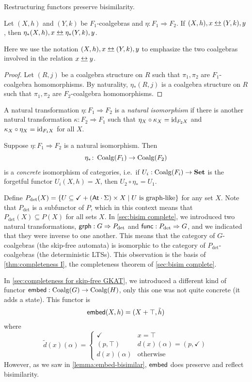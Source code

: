 \documentclass[orivec,envcountsect,envcountsame]{llncs}
\begin{document}
Restructuring functors preserve bisimilarity.

\begin{lemma}
	Let \((X, h)\) and \((Y, k)\) be \(F_1\)-coalgebras and \(\eta : F_1 \Rightarrow F_2\).
	If $(X, h), x \bisim (Y, k), y$, then $\eta_*(X, h), x \bisim \eta_*(Y, k), y$.
\end{lemma}

Here we use the notation \((X,h), x \bisim (Y, k), y\) to emphasize the two coalgebras involved in the relation \(x \bisim y\).

\begin{proof}
	Let \((R,j)\) be a coalgebra structure on \(R\) such that \(\pi_1,\pi_2\) are \(F_1\)-coalgebra homomorphisms.
	By naturality, \(\eta_*(R, j)\) is a coalgebra structure on \(R\) such that \(\pi_1, \pi_2\) are \(F_2\)-coalgebra homomorphisms.
\end{proof}

A natural transformation \(\eta : F_1 \Rightarrow F_2\) is a \emph{natural isomorphism} if there is another natural transformation \(\kappa : F_2 \Rightarrow F_1\) such that \(\eta_X \circ \kappa_X = \operatorname{id}_{F_2X}\) and \(\kappa_X \circ \eta_X = \operatorname{id}_{F_1X}\) for all \(X\).

\begin{lemma}
	Suppose \(\eta \colon F_1 \Rightarrow F_2\) is a natural isomorphism.
	Then \[\eta_* \colon \operatorname{Coalg}(F_1) \to \operatorname{Coalg}(F_2)\] is a \emph{concrete} isomorphism of categories, i.e.\ if \(U_i : \operatorname{Coalg}(F_i) \to \mathbf{Set}\) is the forgetful functor \(U_i(X, h) = X\), then \(U_2 \circ \eta_* = U_1\).
\end{lemma}

Define \(P_{\det}(X) = \{U \subseteq \checkmark + (\mathsf{At} \cdot \Sigma) \times X \mid U \text{ is graph-like}\}\) for any set \(X\).
Note that \(P_{\det}\) is a subfunctor of \(P\), which in this context means that $P_{\det}(X) \subseteq P(X)$ for all sets $X$.
In \cref{sec:bisim complete}, we introduced two natural transformations, \(\mathsf{grph} : G \Rightarrow P_{\det}\) and \(\mathsf{func} : P_{\det} \Rightarrow G\), and we indicated that they were inverse to one another.
This means that the category of \(G\)-coalgebras (the skip-free automata) is isomorphic to the category of \(P_{\det}\)-coalgebras (the deterministic LTSs).
This observation is the basis of \cref{thm:completeness I}, the completeness theorem of \cref{sec:bisim complete}.

In \cref{sec:completeness for skip-free GKAT}, we introduced a different kind of functor \(\mathsf{embed} : \operatorname{Coalg}(G) \to \operatorname{Coalg}(H)\), only this one was not quite concrete (it adds a state).
This functor is
\[
\mathsf{embed}(X, h) = (X + \top, \tilde h)
\]
where
\[
\tilde{d}(x)(\alpha) =
\begin{cases}
	\checkmark & x = \top \\
	(p, \top) & d(x)(\alpha) = (p, \checkmark) \\
	d(x)(\alpha) & \text{otherwise}
\end{cases}
\]
However, as we saw in \cref{lemma:embed-bisimilar}, \(\mathsf{embed}\) does preserve and reflect bisimilarity.
\end{document}
